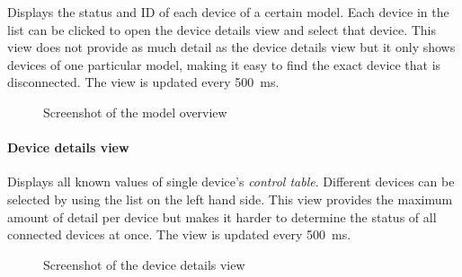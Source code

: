 Displays the status and ID of each device of a certain model. Each device in the list can be clicked
to open the device details view and select that device. This view does not provide as much detail as
the device details view but it only shows devices of one particular model, making it easy to find
the exact device that is disconnected. The view is updated every \SI{500}{\milli\second}.

\begin{figure}[H]
    \centering
    \setlength{\fboxsep}{0mm}
    \caption{Screenshot of the model overview}
\end{figure}

\paragraph{Device details view}

Displays all known values of single device's \textit{control table}. Different devices can be selected
by using the list on the left hand side. This view provides the maximum amount of detail per device
but makes it harder to determine the status of all connected devices at once. The view is updated every
\SI{500}{\milli\second}.

\begin{figure}[H]
    \centering
    \setlength{\fboxsep}{0mm}
    \caption{Screenshot of the device details view}
\end{figure}

